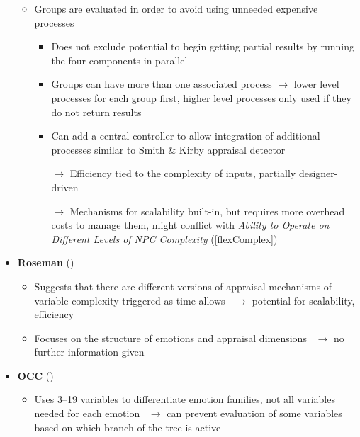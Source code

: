 \begin{itemize}
\begin{itemize}
        \item Groups are evaluated in order to avoid using unneeded expensive
        processes~\citep[p.~99--100, 102--103]{scherer2001appraisalB}
        \begin{itemize}
            \item Does not exclude potential to begin getting partial results by
            running the four components in parallel

            \item Groups can have more than one associated process
            $\rightarrow$ lower level processes for each group first, higher
            level processes only used if they do not return results

            \item Can add a central controller to allow integration of
            additional processes similar to Smith \& Kirby appraisal
            detector~\citep[p.~103--105]{scherer2001appraisalB}

            \item [$\rightarrow$] Efficiency tied to the complexity of inputs,
            partially designer-driven

            \item [$\rightarrow$] Mechanisms for scalability built-in, but
            requires more overhead costs to manage them, might conflict with
            \textit{Ability to Operate on Different Levels of NPC Complexity}
            (\ref{flexComplex})
        \end{itemize}
    \end{itemize}

    \item \textbf{Roseman} (\weak)
    \begin{itemize}
        \item Suggests that there are different versions of appraisal
        mechanisms of variable complexity triggered as time
        allows~\citep[p.~77]{roseman2001model} $\rightarrow$ potential for
        scalability, efficiency

        \item Focuses on the structure of emotions and appraisal
        dimensions~\citep[p.~68, 81]{roseman2001model} $\rightarrow$ no further
        information given
    \end{itemize}

    \item \textbf{OCC} (\good)
    \begin{itemize}
        \item Uses 3--19 variables to differentiate emotion families, not all
        variables needed for each emotion~\citep[p.~19, 60, 69]{occ}
        $\rightarrow$ can prevent evaluation of some variables based on which
        branch of the tree is active


\end{itemize}
\end{itemize}
